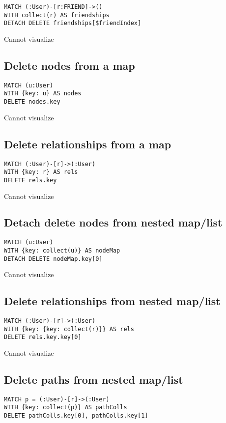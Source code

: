 \begin{lstlisting}
MATCH (:User)-[r:FRIEND]->()
WITH collect(r) AS friendships
DETACH DELETE friendships[$friendIndex]
\end{lstlisting}

Cannot visualize
\subsection{Delete nodes from a map}

\begin{lstlisting}
MATCH (u:User)
WITH {key: u} AS nodes
DELETE nodes.key
\end{lstlisting}

Cannot visualize
\subsection{Delete relationships from a map}

\begin{lstlisting}
MATCH (:User)-[r]->(:User)
WITH {key: r} AS rels
DELETE rels.key
\end{lstlisting}

Cannot visualize
\subsection{Detach delete nodes from nested map/list}

\begin{lstlisting}
MATCH (u:User)
WITH {key: collect(u)} AS nodeMap
DETACH DELETE nodeMap.key[0]
\end{lstlisting}

Cannot visualize
\subsection{Delete relationships from nested map/list}

\begin{lstlisting}
MATCH (:User)-[r]->(:User)
WITH {key: {key: collect(r)}} AS rels
DELETE rels.key.key[0]
\end{lstlisting}

Cannot visualize
\subsection{Delete paths from nested map/list}

\begin{lstlisting}
MATCH p = (:User)-[r]->(:User)
WITH {key: collect(p)} AS pathColls
DELETE pathColls.key[0], pathColls.key[1]
\end{lstlisting}

